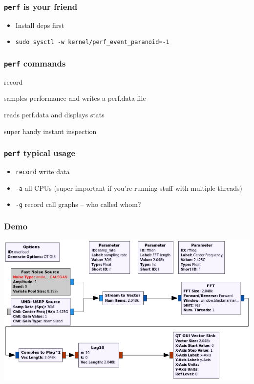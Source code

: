 \documentclass[aspectratio=169]{beamer}
\begin{document}
\begin{frame}
  \frametitle{\texttt{perf} is your friend}
  \begin{itemize}
    \item Install deps first
  \item \lstinline{sudo sysctl -w kernel/perf_event_paranoid=-1}
  \end{itemize}
\end{frame}

\begin{frame}
  \frametitle{\texttt{perf} commands}
  \begin{labeling}{record}
  \item [record] samples performance and writes a perf.data file
  \item [report] reads perf.data and displays stats
  \item [top] super handy instant inspection
  \end{labeling}
\end{frame}
\begin{frame}
  \frametitle{\texttt{perf} typical usage}
  \begin{itemize}
  \item \lstinline{record} write data
    \item \lstinline{-a} all CPUs {\small(super important if you're running stuff with
        multiple threads)}
      \item \lstinline{-g} record call graphs -- who called whom?
  \end{itemize}
\end{frame}
\begin{frame}
  \frametitle{Demo}
  {\centering\includegraphics[height=0.75\textheight]{overload}}
\end{frame}
\end{document}

